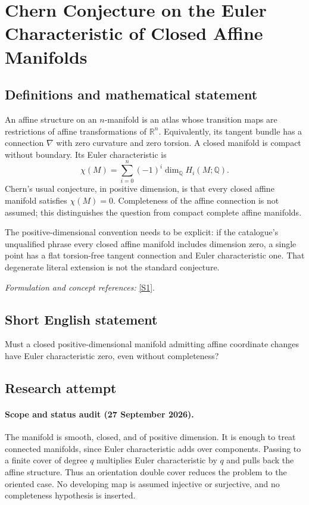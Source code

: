 \documentclass[11pt]{article}
\begin{document}
\section*{\texorpdfstring{Chern Conjecture on the Euler Characteristic of Closed Affine Manifolds}{Chern Conjecture on the Euler Characteristic of Closed Affine Manifolds}}\label{498}
\subsection{Definitions and mathematical statement}
An affine structure on an $n$-manifold is an atlas whose transition maps are restrictions of affine transformations of ${\mathbb{R}}^n$. Equivalently, its tangent bundle has a connection $\nabla$ with zero curvature and zero torsion. A closed manifold is compact without boundary. Its Euler characteristic is
\[
 \chi(M)=\sum_{i=0}^n(-1)^i\dim_{{\mathbb{Q}}} H_i(M;{\mathbb{Q}}).
\]
Chern's usual conjecture, in positive dimension, is that every closed affine manifold satisfies $\chi(M)=0$. Completeness of the affine connection is not assumed; this distinguishes the question from compact complete affine manifolds.

The positive-dimensional convention needs to be explicit: if the catalogue's unqualified phrase every closed affine manifold includes dimension zero, a single point has a flat torsion-free tangent connection and Euler characteristic one. That degenerate literal extension is not the standard conjecture.
\par\smallskip\textit{Formulation and concept references:} \href{https://link.springer.com/article/10.1007/s41884-026-00193-8}{[S1]}.

\subsection{Short English statement}
Must a closed positive-dimensional manifold admitting affine coordinate changes have Euler characteristic zero, even without completeness?
\subsection{Research attempt}

\paragraph{Scope and status audit (27 September 2026).}
The manifold is smooth, closed, and of positive dimension. It is enough to
treat connected manifolds, since Euler characteristic adds over components.
Passing to a finite cover of degree $q$ multiplies Euler characteristic by
$q$ and pulls back the affine structure. Thus an orientation double cover
reduces the problem to the oriented case. No developing map is assumed
injective or surjective, and no completeness hypothesis is inserted.
\end{document}
